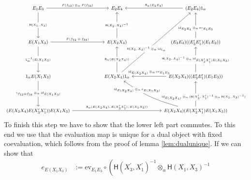 \begin{prf}
\begin{enumerate}
\begin{equation*}
\begin{tikzcd}[row sep=4.5em,column sep=5.3em,font=\footnotesize,every label/.append style={font=\tiny}]
  E_{1} E_{3}
  \ar{r}{F(f_{12}) \otimes_{\alpha} F(f_{34})}
  \ar{d}[description]{\mathsf{H}(X_{1},X_{3})}
  &
  E_{2} E_{4}
  &
  (E_{2} E_{4}) 1_{\alpha}
  \ar{l}[swap]{\mathsf{R}_{\alpha}(E_{2} E_{4})}
  \\
  E(X_{1} X_{3})
  \ar{r}{F(f_{12} \otimes f_{34})}
  \ar{d}[description]{\mathsf{L}_{\alpha}^{-1}(E(X_{1} X_{3})}
  &
  E(X_{2} X_{4})
  \ar{u}[description]{\mathsf{H}(X_{2},X_{4})^{-1}}
  &
  (E_{2} E_{4}) ((E_{3}^{\prime} E_{1}^{\prime}) (E_{1} E_{3}))
  \ar{u}[description,yshift=-2mm]{\mathrm{id}_{E_{2} E_{4}} \otimes_{\alpha} \mathrm{ev}_{E_{1} E_{3}}}
  \\
  1_{\alpha} E(X_{1} X_{3})
  \ar{d}[description]{\gamma_{f_{12} \otimes f_{34}} \otimes_{\alpha} \mathrm{id}_{E(X_{1} X_{3})}}
  &
  E(X_{2} X_{4}) 1_{\alpha}
  \ar{u}[description]{\mathsf{R}_{\alpha}(E(X_{2} X_{4}))}
  \ar{uur}[description,xshift=-6mm,yshift=-4mm]{\mathsf{H}(X_{2},X_{4})^{-1} \otimes_{\alpha} \mathrm{id}_{1_{\alpha}}}
  &
  E(X_{2} X_{4}) ((E_{3}^{\prime} E_{1}^{\prime}) (E_{1} E_{3}))
  \ar{u}[description]{\mathsf{H}(X_{2},X_{4})^{-1} \otimes_{\alpha} \mathrm{id}_{E(X_{3}^{\prime} X_{1}^{\prime}) E(X_{1} X_{3})}}
  \ar{l}[swap,yshift=1pt]{\mathrm{id}_{E(X_{2} X_{4})} \otimes_{\alpha} \mathrm{ev}_{E_{1} E_{3}}}
  \\
  (E(X_{2} X_{4}) E(X_{3}^{\prime} X_{1}^{\prime})) E(X_{1} X_{3})
  \ar{rr}{\mathsf{A}_{\alpha}(E(X_{2} X_{4}),E(X_{3}^{\prime} X_{1}^{\prime}), E(X_{1} X_{3}))}
  &
  &
  E(X_{2} X_{4}) (E(X_{3}^{\prime} X_{1}^{\prime}) E(X_{1} X_{3}))
  \ar[bend left=10]{ul}[description,xshift=-8mm,yshift=4mm]{\mathrm{id}_{E(X_{2} X_{4})} \otimes_{\alpha} e_{E(X_{1} X_{3})}}
  \ar{u}[description,xshift=5mm,yshift=-2mm]{\mathrm{id}_{E(X_{2} X_{4})} \otimes_{\alpha} (\mathsf{H}(X_{3}^{\prime},X_{1}^{\prime})^{-1} \otimes_{\alpha} \mathsf{H}(X_{1},X_{3})^{-1})}
\end{tikzcd}
\end{equation*}
To finish this step we have to show that the lower left part commutes. To this end we use that the evaluation map is unique for a dual object with fixed coevaluation, which follows from the proof of lemma \ref{lem:dualunique}. If we can show that
\begin{align*}
  e_{E(X_{1} X_{3})}
  &:=
  \mathrm{ev}_{E_{1} E_{3}}
  \circ
  \left(
    \mathsf{H}(X_{3}^{\prime},X_{1}^{\prime})^{-1}
    \otimes_{\alpha}
    \mathsf{H}(X_{1},X_{3})^{-1}

\end{align*}
\end{enumerate}
\end{prf}
